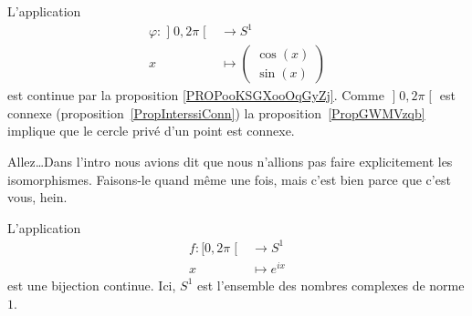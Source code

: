 \begin{example} \label{EXooJFDPooBZADKs}
	L'application
	\begin{equation}
		\begin{aligned}
			\varphi\colon \mathopen] 0 , 2\pi \mathclose[ & \to S^1                \\
			x                                             & \mapsto \begin{pmatrix}
				                                                        \cos(x) \\
				                                                        \sin(x)
			                                                        \end{pmatrix}
		\end{aligned}
	\end{equation}
	est continue par la proposition \ref{PROPooKSGXooOqGyZj}. Comme \( \mathopen] 0 , 2\pi \mathclose[\) est connexe (proposition~\ref{PropInterssiConn}) la proposition~\ref{PropGWMVzqb} implique que le cercle privé d'un point est connexe.
\end{example}


Allez\ldots Dans l'intro nous avions dit que nous n'allions pas faire explicitement les isomorphismes. Faisons-le quand même une fois, mais c'est bien parce que c'est vous, hein.
\begin{proposition}     \label{PROPooZEFEooEKMOPT}
	L'application
	\begin{equation}
		\begin{aligned}
			f\colon \mathopen[ 0 , 2\pi \mathclose[ & \to S^1         \\
			x                                       & \mapsto  e^{ix}
		\end{aligned}
	\end{equation}
	est une bijection continue. Ici, \( S^1\) est l'ensemble des nombres complexes de norme \( 1\).
\end{proposition}


